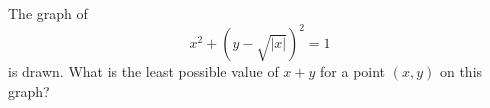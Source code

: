 The graph of
\[x^2+\left(y-\sqrt{|x|}\right)^2=1\]
is drawn. What is the least possible value of $x+y$ for a point $(x,y)$ on this graph?
